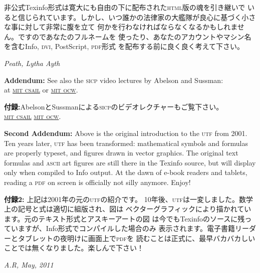 \documentclass[8pt,oneside]{book}
\newcommand{\acronym}[1]{\textsc{\MakeLowercase{#1}}}
\begin{document}
非公式Texinfo形式は寛大にも自由の下に配布された\acronym{HTML}版の魂を引き継いで
いると信じられています。しかし、いつ誰かの法律家の大艦隊が良心に基づく小さな事に対して非常に腹を立て
何かを行わなければならなくなるかもしれません。ですのであなたのフルネームを
使ったり、あなたのアカウントやマシン名を含むInfo, \acronym{DVI}, PostScript, \acronym{PDF}形式
を配布する前に良く良く考えて下さい。

\noindent
\textit{Peath, Lytha Ayth}

\vspace{1.0em}
\noindent
\textbf{Addendum:} See also the \acronym{SICP} video lectures by Abelson and Sussman:\\
at \href{http://groups.csail.mit.edu/mac/classes/6.001/abelson-sussman-lectures/}{\acronym{MIT CSAIL}} or 
\href{http://ocw.mit.edu/courses/electrical-engineering-and-computer-science/6-001-structure-and-interpretation-of-computer-programs-spring-2005/video-lectures/}{\acronym{MIT OCW}}.

\textbf{付録:}AbelsonとSussmanによる\acronym{SICP}のビデオレクチャーもご覧下さい。\\
\href{http://groups.csail.mit.edu/mac/classes/6.001/abelson-sussman-lectures/}{\acronym{MIT CSAIL}}
\href{http://ocw.mit.edu/courses/electrical-engineering-and-computer-science/6-001-structure-and-interpretation-of-computer-programs-spring-2005/video-lectures/}{\acronym{MIT OCW}}.


\vspace{0.5em}
\noindent 
\textbf{Second Addendum:} Above is the original introduction to the \acronym{UTF} 
from 2001. Ten years later, \acronym{UTF} has been transformed: mathematical 
symbols and formulas are properly typeset, and figures drawn in 
vector graphics. The original text formulas and \acronym{ASCII} art figures 
are still there in the Texinfo source, but will display only when compiled 
to Info output. At the dawn of e-book readers and tablets, reading a 
\acronym{PDF} on screen is officially not silly anymore. Enjoy!

\noindent
\textbf{付録2:} 上記は2001年の元の\acronym{UTF}の紹介です。
10年後、\acronym{UTF}は一変しました。数学上の記号と式は適切に組版され、図は
ベクターグラフィックにより描かれています。元のテキスト形式とアスキーアートの図
は今でもTexinfoのソースに残っていますが、Info形式でコンパイルした場合のみ
表示されます。電子書籍リーダーとタブレットの夜明けに画面上で\acronym{PDF}を
読むことは正式に、最早バカバカしいことでは無くなりました。楽しんで下さい！

\vspace{0.5em}
\noindent
\textit{A.R, May, 2011}
\end{document}

